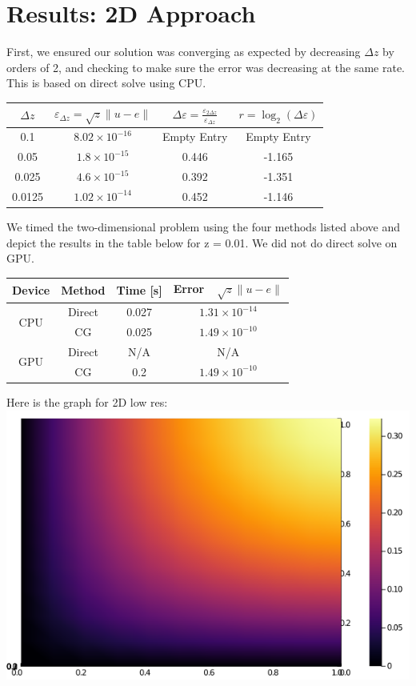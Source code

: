 \documentclass[11pt]{article}
\begin{document}
		
	\section{Results: 2D Approach}
	First, we ensured our solution was converging as expected by decreasing $ \Delta z $ by orders of 2, and checking to make sure the error was decreasing at the same rate. This is based on direct solve using CPU.
		\begin{center}
		\renewcommand{\arraystretch}{2.0}
		\begin{tabular}{c|c|c|c}
			\hline\hline
			$\displaystyle \Delta z $&$\displaystyle \varepsilon_{\Delta z} = \sqrt{z}\lVert u-e\rVert $&$ \displaystyle \Delta\varepsilon = \frac{\varepsilon_{2\Delta z}}{\varepsilon_{\Delta z}} $&$\displaystyle r = \log_2\left(\Delta\varepsilon\right) $\\
			\hline
			0.1&$8.02\times 10^{-16}$&Empty Entry&Empty Entry\\
			0.05&$1.8\times 10^{-15}$ &0.446&-1.165\\
			0.025&$4.6\times 10^{-15}$&0.392&-1.351\\
			0.0125&$1.02\times 10^{-14}$&0.452&-1.146\\
			\hline
		\end{tabular}
	\end{center}
	We timed the two-dimensional problem using the four methods listed above and depict the results in the table below for \Delta z = 0.01. We did not do direct solve on GPU.
	\begin{center}
		\renewcommand{\arraystretch}{1.5}
		\begin{tabular}{c|c|c|c}
			\hline\hline
			\textbf{Device}&\textbf{Method}&\textbf{Time [s]}&\textbf{Error~~$\sqrt{z}\lVert u-e\rVert $}\\
			\hline
			\multirow{2}{*}{CPU}&Direct&0.027&$1.31\times 10^{-14}$\\
			&CG&0.025&$1.49\times 10^{-10}$\\
			\hline
			\multirow{2}{*}{GPU}&Direct&N/A&N/A\\
			&CG&0.2&$1.49\times 10^{-10}$\\
			\hline
		\end{tabular}
	\end{center}
	
	Here is the graph for 2D low res:\\
	\includegraphics[scale=0.5]{2D_low_res.png}
	
\end{document}
